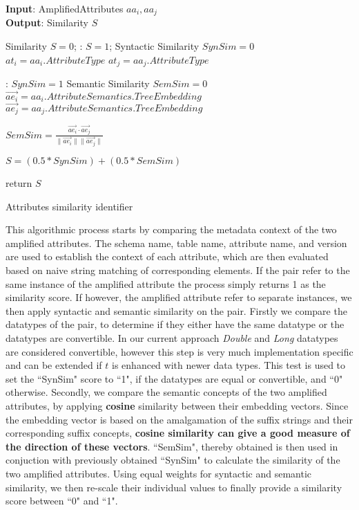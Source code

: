\begin{algorithm}
	\textbf{Input}: AmplifiedAttributes $ aa_i, aa_j$ \\
	\textbf{Output}: Similarity $S$ 
	\begin{algorithmic}[1]
		\State Similarity $S = 0$;
		:
		\State $S = 1$;
		\Else
		\State Syntactic Similarity $SynSim = 0 $
		\State $at_i = aa_i.AttributeType$
		\State $at_j = aa_j.AttributeType$
		
		: 
		\State	$SynSim = 1$
		\EndIf
		\State Semantic Similarity $SemSim = 0 $
		\State $\vec{ae_i} =  aa_i.Attribute Semantics
		.TreeEmbedding$
		\State $\vec{ae_j} =  aa_j.Attribute Semantics
		.TreeEmbedding$
		
		\State $SemSim = \frac{\vec{ae_i} \cdot \vec{ae_j}}{\|\vec{ae_i}\|\|\vec{ae_j}\|}$
		
		\State $S = (0.5 * SynSim) + (0.5 * SemSim) $
		\EndIf
		
		\State return $S$
		\caption{Attributes similarity identifier}
		\label{knowledgeEvolAlgo}
	\end{algorithmic}
\end{algorithm}

This algorithmic process starts by comparing the metadata context of the two amplified attributes. The schema name, table name, attribute name, and version are used to establish the context of each attribute, which are then evaluated based on naive string matching of corresponding elements. If the pair refer to the same instance of the amplified attribute the process simply returns 1 as the similarity score. If however, the amplified attribute refer to separate instances, we then apply syntactic and semantic similarity on the pair. Firstly we compare the datatypes of the pair, to determine if they either have the same datatype or the datatypes are convertible. In our current approach \textit{Double} and \textit{Long} datatypes are considered convertible, however this step is very much implementation specific and can be extended if $t$ is enhanced with newer data types. This test is used to set the ``SynSim" score to ``1", if the datatypes are equal or convertible, and ``0" otherwise. Secondly, we compare the semantic concepts of the two amplified attributes, by applying \textbf{cosine} similarity between their embedding vectors. Since the embedding vector is based on the amalgamation of the suffix strings and their corresponding suffix concepts, \textbf{cosine similarity can give a good measure of the direction of these vectors}. ``SemSim", thereby obtained is then used in conjuction with previously obtained ``SynSim" to calculate the similarity of the two amplified attributes. Using equal weights for syntactic and semantic similarity, we then re-scale their individual values to finally provide a similarity score between ``0" and ``1". 

